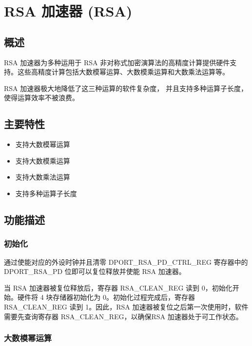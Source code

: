 \documentclass[main\_\_CN.tex]{subfiles}
\begin{document}
\hypertarget{rsa}{}
\chapter{RSA 加速器 (RSA)}
\label{mod:rsa}

\section{概述}

RSA 加速器为多种运用于 RSA 非对称式加密演算法的高精度计算提供硬件支持。这些高精度计算包括大数模幂运算、大数模乘运算和大数乘法运算等。

RSA 加速器极大地降低了这三种运算的软件复杂度，
并且支持多种运算子长度，使得运算效率不被浪费。

\section{主要特性}

\begin{itemize}
    \item 支持大数模幂运算
    \item 支持大数模乘运算
    \item 支持大数乘法运算
    \item 支持多种运算子长度
\end{itemize}


\section{功能描述}

\subsection{初始化}
通过使能对应的外设时钟并且清零 DPORT\_RSA\_PD\_CTRL\_REG 寄存器中的 DPORT\_RSA\_PD 位即可以复位释放并使能 RSA 加速器。

当 RSA 加速器被复位释放后，寄存器 RSA\_CLEAN\_REG 读到 0，初始化开始。硬件将 4 块存储器初始化为 0。初始化过程完成后，寄存器 RSA\_CLEAN\_REG 读到 1。因此，RSA 加速器被复位之后第一次使用时，软件需要先查询寄存器 RSA\_CLEAN\_REG，以确保RSA 加速器处于可工作状态。

\subsection{大数模幂运算}
\end{document}
